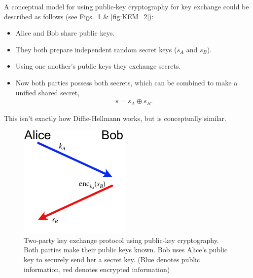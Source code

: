 A conceptual model for using public-key cryptography for key exchange could be described as follows (see Figs.~\ref{fig:KEM_1} \& \ref{fig:KEM_2}):
\begin{itemize}
	\item Alice and Bob share public keys.
	\item They both prepare independent random secret keys ($s_A$ and $s_B$).
	\item Using one another's public keys they exchange secrets.
	\item Now both parties possess both secrets, which can be combined to make a unified shared secret,
		\begin{align}
			s=s_A\oplus s_B.
		\end{align}
\end{itemize}
This isn't exactly how Diffie-Hellmann works, but is conceptually similar.

\begin{figure}[!htb]
	\centering
	\includegraphics[width=0.75\columnwidth]{figures/Key_exchange_one_way}
	\caption{Two-party key exchange protocol using public-key cryptography. Both parties make their public keys known. Bob uses Alice's public key to securely send her a secret key. (Blue denotes public information, red denotes encrypted information)} \label{fig:KEM_1}
\end{figure}


